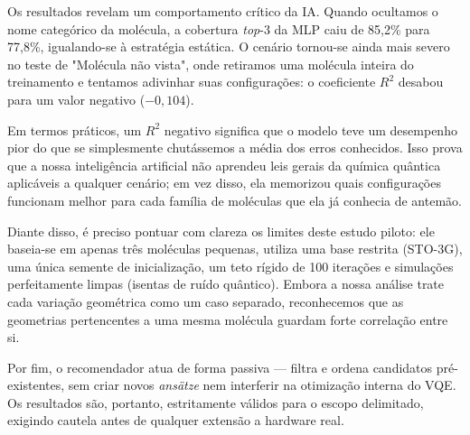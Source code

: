 Os resultados revelam um comportamento crítico da IA. Quando ocultamos o nome 
categórico da molécula, a cobertura \textit{top}-3 da MLP caiu de 85,2\% para 
77,8\%, igualando-se à estratégia estática. O cenário tornou-se ainda mais severo 
no teste de "Molécula não vista", onde retiramos uma molécula inteira do 
treinamento e tentamos adivinhar suas configurações: o coeficiente $R^2$ desabou 
para um valor negativo ($-0,104$). 

Em termos práticos, um $R^2$ negativo significa que o modelo teve um desempenho 
pior do que se simplesmente chutássemos a média dos erros conhecidos. Isso prova
que a nossa inteligência artificial não aprendeu leis gerais da química quântica 
aplicáveis a qualquer cenário; em vez disso, ela memorizou quais configurações 
funcionam melhor para cada família de moléculas que ela já conhecia de antemão.

Diante disso, é preciso pontuar com clareza os limites deste estudo piloto: ele 
baseia-se em apenas três moléculas pequenas, utiliza uma base restrita (STO-3G), 
uma única semente de inicialização, um teto rígido de 100 iterações e simulações 
perfeitamente limpas (isentas de ruído quântico). Embora a nossa análise trate cada 
variação geométrica como um caso separado, reconhecemos que as geometrias 
pertencentes a uma mesma molécula guardam forte correlação entre si. 

Por fim, o recomendador atua de forma passiva — filtra e ordena candidatos
pré-existentes, sem criar novos \textit{ansätze} nem interferir na otimização
interna do VQE. Os resultados são, portanto, estritamente válidos para o escopo
delimitado, exigindo cautela antes de qualquer extensão a hardware real.